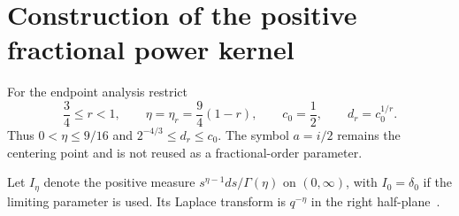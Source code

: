 \documentclass[11pt,a4paper]{article}
\numberwithin{equation}{section}
\theoremstyle{definition}
\theoremstyle{remark}
\begin{document}
\section{Construction of the positive fractional power kernel}\label{sec:positive-kernel}

For the endpoint analysis restrict
\begin{equation}\label{eq:kernel-parameters}
 \frac34\le r<1,\qquad
 \eta=\eta_r=\frac94(1-r),\qquad
 c_0=\frac12,\qquad d_r=c_0^{1/r}.
\end{equation}
Thus $0<\eta\le9/16$ and $2^{-4/3}\le d_r\le c_0$. The symbol $a=i/2$ remains the centering point and is not reused as a fractional-order parameter.

Let $I_\eta$ denote the positive measure
$s^{\eta-1}ds/\Gamma(\eta)$ on $(0,\infty)$, with $I_0=\delta_0$ if the limiting parameter is used. Its Laplace transform is $q^{-\eta}$ in the right half-plane~\cite[Eq.~5.9.1]{DLMFlaplace}.
\end{document}
